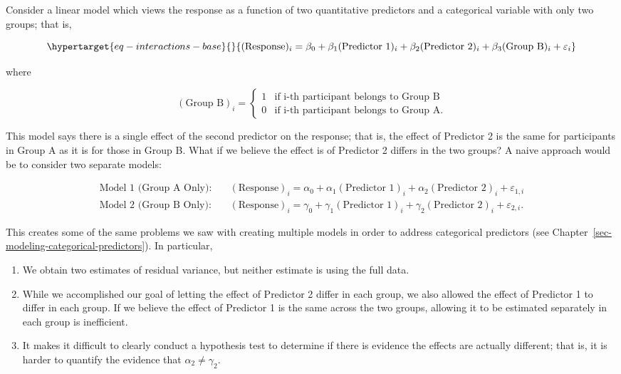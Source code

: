 \documentclass[
  letterpaper,
  DIV=11,
  numbers=noendperiod]{scrreprt}
\providecommand{\tightlist}{%
  \setlength{\itemsep}{0pt}\setlength{\parskip}{0pt}}\usepackage{longtable,booktabs,array}
\theoremstyle{definition}
\theoremstyle{definition}
\theoremstyle{remark}
\begin{document}
Consider a linear model which views the response as a function of two
quantitative predictors and a categorical variable with only two groups;
that is,

\begin{equation}\protect\hypertarget{eq-interactions-base}{}{(\text{Response})_i = \beta_0 + \beta_1 (\text{Predictor 1})_i + \beta_2 (\text{Predictor 2})_i + \beta_3 (\text{Group B})_i + \varepsilon_i}\label{eq-interactions-base}\end{equation}

where

\[
(\text{Group B})_i = \begin{cases}
  1 & \text{if i-th participant belongs to Group B} \\
  0 & \text{if i-th participant belongs to Group A.}
\end{cases}
\]

This model says there is a single effect of the second predictor on the
response; that is, the effect of Predictor 2 is the same for
participants in Group A as it is for those in Group B. What if we
believe the effect is of Predictor 2 differs in the two groups? A naive
approach would be to consider two separate models:

\[
\begin{aligned}
  \text{Model 1 (Group A Only)}:& \quad (\text{Response})_i = 
    \alpha_0 + \alpha_1 (\text{Predictor 1})_i + \alpha_2 (\text{Predictor 2})_i + \varepsilon_{1,i} \\
  \text{Model 2 (Group B Only)}:& \quad (\text{Response})_i =
    \gamma_0 + \gamma_1 (\text{Predictor 1})_i + \gamma_2 (\text{Predictor 2})_i + \varepsilon_{2,i}.
\end{aligned}
\]

This creates some of the same problems we saw with creating multiple
models in order to address categorical predictors (see
Chapter~\ref{sec-modeling-categorical-predictors}). In particular,

\begin{enumerate}
\def\labelenumi{\arabic{enumi}.}
\tightlist
\item
  We obtain two estimates of residual variance, but neither estimate is
  using the full data.
\item
  While we accomplished our goal of letting the effect of Predictor 2
  differ in each group, we also allowed the effect of Predictor 1 to
  differ in each group. If we believe the effect of Predictor 1 is the
  same across the two groups, allowing it to be estimated separately in
  each group is inefficient.
\item
  It makes it difficult to clearly conduct a hypothesis test to
  determine if there is evidence the effects are actually different;
  that is, it is harder to quantify the evidence that
  \(\alpha_2 \neq \gamma_2\).
\end{enumerate}
\end{document}
